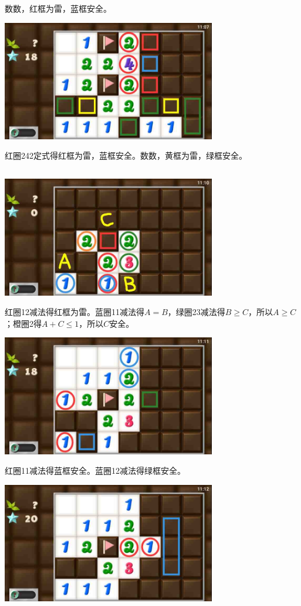 数数，红框为雷，蓝框安全。
\begin{center}
    \includegraphics[width=0.7\textwidth]{puzzlelow/213-5.jpg}
\end{center}
红圈242定式得红框为雷，蓝框安全。数数，黄框为雷，绿框安全。

\subsection{} %
\begin{center}
    \includegraphics[width=0.7\textwidth]{puzzlelow/214-1.jpg}
\end{center}
红圈12减法得红框为雷。蓝圈11减法得$A=B$，绿圈23减法得$B\ge C$，所以$A\ge C$；橙圈2得$A+C\le 1$，所以$C$安全。
\begin{center}
    \includegraphics[width=0.7\textwidth]{puzzlelow/214-2.jpg}
\end{center}
红圈11减法得蓝框安全。蓝圈12减法得绿框安全。
\begin{center}
    \includegraphics[width=0.7\textwidth]{puzzlelow/214-3.jpg}
\end{center}
